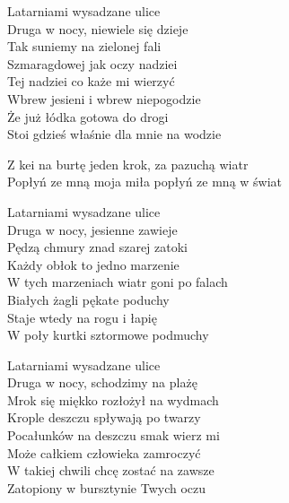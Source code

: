 \begin{text}
    Latarniami wysadzane ulice\\
    Druga w nocy, niewiele się dzieje\\
    Tak suniemy na zielonej fali\\
    Szmaragdowej jak oczy nadziei\\
    \vin Tej nadziei co każe mi wierzyć\\
    \vin Wbrew jesieni i wbrew niepogodzie\\
    \vin Że już łódka gotowa do drogi\\
    \vin Stoi gdzieś właśnie dla mnie na wodzie

    Z kei na burtę jeden krok, za pazuchą wiatr\\
    Popłyń ze mną moja miła popłyń ze mną w świat

    Latarniami wysadzane ulice\\
    Druga w nocy, jesienne zawieje\\
    Pędzą chmury znad szarej zatoki\\
    Każdy obłok to jedno marzenie\\
    \vin W tych marzeniach wiatr goni po falach\\
    \vin Białych żagli pękate poduchy\\
    \vin Staje wtedy na rogu i łapię\\
    \vin W poły kurtki sztormowe podmuchy

    Latarniami wysadzane ulice\\
    Druga w nocy, schodzimy na plażę\\
    Mrok się miękko rozłożył na wydmach\\
    Krople deszczu spływają po twarzy\\
    \vin Pocałunków na deszczu smak wierz mi\\
    \vin Może całkiem człowieka zamroczyć\\
    \vin W takiej chwili chcę zostać na zawsze\\
    \vin Zatopiony w bursztynie Twych oczu
\end{text}
\begin{chord}

\end{chord}